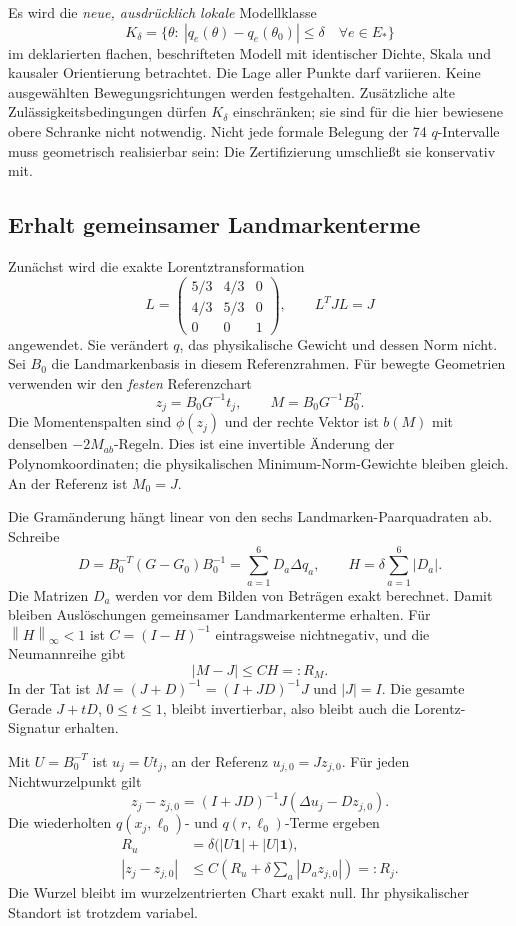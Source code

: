 \documentclass[11pt,a4paper]{article}
\newcommand{\norm}[1]{\left\lVert#1\right\rVert}\newcommand{\abs}[1]{\left|#1\right|}
\begin{document}
Es wird die \emph{neue, ausdrücklich lokale} Modellklasse
\begin{equation}\label{eq:K}
 K_\delta=\{\theta:\ |q_e(\theta)-q_e(\theta_0)|\leq\delta\quad\forall e\in E_*\}
\end{equation}
im deklarierten flachen, beschrifteten Modell mit identischer Dichte, Skala und kausaler Orientierung betrachtet. Die Lage aller Punkte darf variieren. Keine ausgewählten Bewegungsrichtungen werden festgehalten. Zusätzliche alte Zulässigkeitsbedingungen dürfen $K_\delta$ einschränken; sie sind für die hier bewiesene obere Schranke nicht notwendig. Nicht jede formale Belegung der 74 $q$-Intervalle muss geometrisch realisierbar sein: Die Zertifizierung umschließt sie konservativ mit.

\subsection{Erhalt gemeinsamer Landmarkenterme}
Zunächst wird die exakte Lorentztransformation
\[
 L=\begin{pmatrix}5/3&4/3&0\\4/3&5/3&0\\0&0&1\end{pmatrix},\qquad L^TJL=J
\]
angewendet. Sie verändert $q$, das physikalische Gewicht und dessen Norm nicht. Sei $B_0$ die Landmarkenbasis in diesem Referenzrahmen. Für bewegte Geometrien verwenden wir den \emph{festen} Referenzchart
\[
 z_j=B_0G^{-1}t_j,\qquad M=B_0G^{-1}B_0^T.
\]
Die Momentenspalten sind $\phi(z_j)$ und der rechte Vektor ist $b(M)$ mit denselben $-2M_{ab}$-Regeln. Dies ist eine invertible Änderung der Polynomkoordinaten; die physikalischen Minimum-Norm-Gewichte bleiben gleich. An der Referenz ist $M_0=J$.

Die Gramänderung hängt linear von den sechs Landmarken-Paarquadraten ab. Schreibe
\[
 D=B_0^{-T}(G-G_0)B_0^{-1}=\sum_{a=1}^6D_a\Delta q_a,
 \qquad H=\delta\sum_{a=1}^6|D_a|.
\]
Die Matrizen $D_a$ werden vor dem Bilden von Beträgen exakt berechnet. Damit bleiben Auslöschungen gemeinsamer Landmarkenterme erhalten. Für $\norm H_\infty<1$ ist $C=(I-H)^{-1}$ eintragsweise nichtnegativ, und die Neumannreihe gibt
\begin{equation}\label{eq:RM}
 |M-J|\leq CH=:R_M.
\end{equation}
In der Tat ist $M=(J+D)^{-1}=(I+JD)^{-1}J$ und $|J|=I$. Die gesamte Gerade $J+tD$, $0\leq t\leq1$, bleibt invertierbar, also bleibt auch die Lorentz-Signatur erhalten.

Mit $U=B_0^{-T}$ ist $u_j=Ut_j$, an der Referenz $u_{j,0}=Jz_{j,0}$. Für jeden Nichtwurzelpunkt gilt
\[
 z_j-z_{j,0}=(I+JD)^{-1}J(\Delta u_j-Dz_{j,0}).
\]
Die wiederholten $q(x_j,\ell_0)$- und $q(r,\ell_0)$-Terme ergeben
\begin{align}
 R_u&=\delta\bigl(|U\mathbf1|+|U|\mathbf1\bigr),\\
 |z_j-z_{j,0}|&\leq C\left(R_u+\delta\sum_a|D_az_{j,0}|\right)=:R_j.\label{eq:Rj}
\end{align}
Die Wurzel bleibt im wurzelzentrierten Chart exakt null. Ihr physikalischer Standort ist trotzdem variabel.
\end{document}
